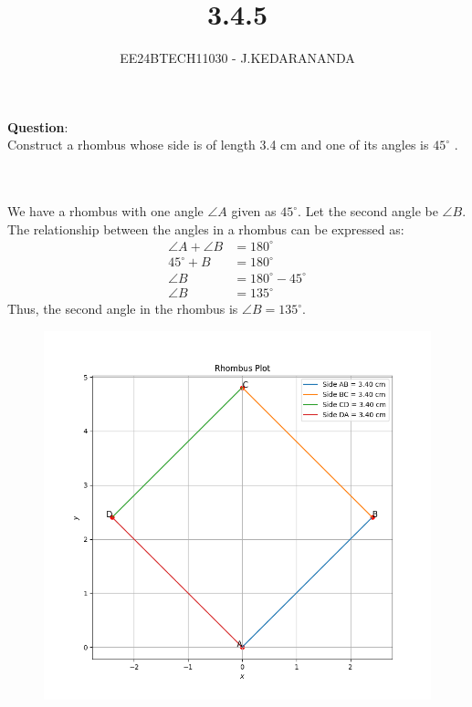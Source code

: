 \documentclass[journal]{IEEEtran}
\begin{document}

\vspace{3cm}

\title{3.4.5}
\author{EE24BTECH11030 - J.KEDARANANDA}
{\let\newpage\relax\maketitle}

\renewcommand{\thefigure}{\theenumi}
\renewcommand{\thetable}{\theenumi}
\setlength{\intextsep}{10pt} %


\renewcommand{\thetable}{\theenumi}


\textbf{Question}:\\
Construct a rhombus whose side is of length 3.4 cm and one of its angles is $45^\circ$ .
\\ \solution \\
    \begin{table}[h!]    
      \centering
      
      \caption{}
    \end{table}\\
We have a rhombus with one angle $\angle{A}$  given as $45^\circ$. Let the second angle be $\angle{B}$. The relationship between the angles in a rhombus can be expressed as:
\begin{align}
  \angle{A} + \angle{B} &= 180^\circ \\
  45^\circ + B &= 180^\circ \\
  \angle{B} &= 180^\circ - 45^\circ \\
  \angle{B} &= 135^\circ
\end{align}
Thus, the second angle in the rhombus is $\angle{B} = 135^\circ$.
    \begin{figure}[h]
       \centering
       \includegraphics[width=\linewidth]{figs/fig1.png}
       \caption{}
       \label{graph}
    \end{figure}
\end{document}
